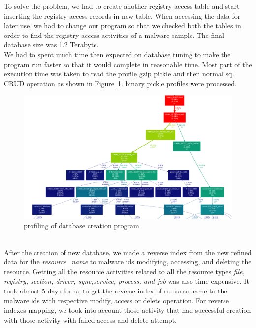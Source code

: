 To solve the problem, we had to create another registry access table and start inserting the registry access records in new table.
When accessing the data for later use, we had to change our program so that we checked both the tables in order to find the registry access activities of a malware sample.
The final database size was 1.2 Terabyte.\\
We had to spent much time then expected on database tuning to make the program run faster so that it would complete in reasonable time.
Most part of the execution time was taken to read the profile gzip pickle and then normal sql CRUD operation as shown in Figure~\ref{fig:dbcreation}.
\gettotalmalwareii{} binary pickle profiles were processed.\\
\begin{figure}
\begin{center}
  \includegraphics[scale=0.27]{figures/db_creation.png}
\end{center}
\caption{profiling of database creation program}
\label{fig:dbcreation}
\end{figure}
\\
After the creation of new database, we made a reverse index from the new refined data for the \emph{resource\_name} to malware ids modifying, accessing, and deleting the resource.
Getting all the resource activities related to all the resource types \emph{file, registry, section, driver, sync,service, process, and job} was also time expensive.
It took almost 5 days for us to get the reverse index of resource name to the malware ids with respective modify, access or delete operation.
For reverse indexes mapping, we took into account those activity that had successful creation with those activity with failed access and delete attempt.
